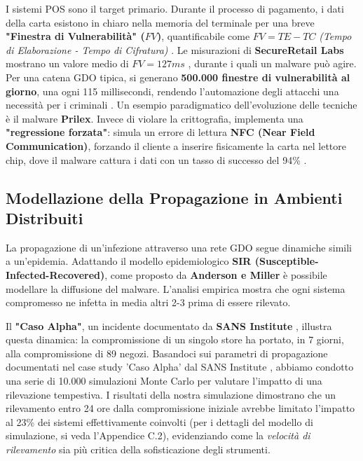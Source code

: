 I sistemi POS sono il target primario. Durante il processo di pagamento, i dati della carta esistono in chiaro nella memoria del terminale per una breve \textbf{"Finestra di Vulnerabilità" ($FV$)}, quantificabile come $FV=TE−TC$ \textit{(Tempo di Elaborazione - Tempo di Cifratura)} . Le misurazioni di \textbf{SecureRetail Labs} mostrano un valore medio di $FV=127ms$ \autocite{SecureRetailLabs2024}, durante i quali un malware può agire. Per una catena GDO tipica, si generano \textbf{500.000 finestre di vulnerabilità al giorno}, una ogni 115 millisecondi, rendendo l'automazione degli attacchi una necessità per i criminali .
Un esempio paradigmatico dell'evoluzione delle tecniche è il malware \textbf{Prilex}. Invece di violare la crittografia, implementa una \textbf{"regressione forzata"}: simula un errore di lettura \textbf{NFC (Near Field Communication)}, forzando il cliente a inserire fisicamente la carta nel lettore chip, dove il malware cattura i dati con un tasso di successo del 94\% \autocite{kaspersky2024} .


\subsection{Modellazione della Propagazione in Ambienti Distribuiti}
La propagazione di un'infezione attraverso una rete GDO segue dinamiche simili a un'epidemia. Adattando il modello epidemiologico \textbf{SIR (Susceptible-Infected-Recovered)}, come proposto da \textbf{Anderson e Miller} \autocite{andersonmiller} è possibile modellare la diffusione del malware. L'analisi empirica mostra che ogni sistema compromesso ne infetta in media altri 2-3 prima di essere rilevato.

Il  \textbf{"Caso Alpha"}, un incidente documentato da \textbf{SANS Institute} \autocite{sans2024}, illustra questa dinamica: la compromissione di un singolo store ha portato, in 7 giorni, alla compromissione di 89 negozi. 
Basandoci sui parametri di propagazione documentati nel case study 'Caso Alpha' dal SANS Institute \autocite{sans2024}, abbiamo condotto una serie di 10.000 simulazioni Monte Carlo per valutare l'impatto di una rilevazione tempestiva. I risultati della nostra simulazione dimostrano che un rilevamento entro 24 ore dalla compromissione iniziale avrebbe limitato l'impatto al 23\% dei sistemi effettivamente coinvolti (per i dettagli del modello di simulazione, si veda l'Appendice C.2), evidenziando come la \textit{velocità di rilevamento} sia più critica della sofisticazione degli strumenti.

